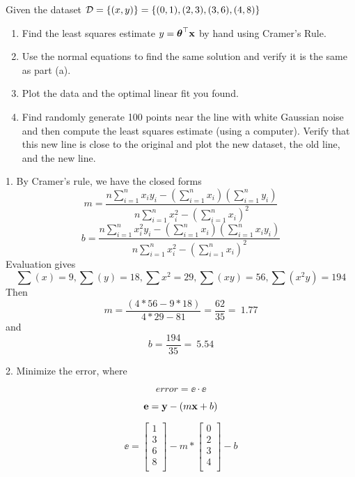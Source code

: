 \documentclass[12pt,letterpaper]{hmcpset}
\begin{document}
\begin{problem}[2]
Given the dataset ${\cal D} = \{(x,y)\} = \{(0,1), (2,3), (3,6), (4,8)\}$
\begin{enumerate}
   \item Find the least squares estimate $y = \hbox{\boldmath$\theta$}^\top{\bf x}$ by hand using
        Cramer's Rule.
    \item Use the normal equations to find the same solution and verify it
        is the same as part (a).
    \item Plot the data and the optimal linear fit you found.
    \item Find randomly generate 100 points near the line with white Gaussian
        noise and then compute the least squares estimate (using a computer).
        Verify that this new line is close to the original and plot the new
        dataset, the old line, and the new line.
\end{enumerate}

\end{problem}
\begin{solution}
1. By Cramer's rule, we have the closed forms
\[
    m = \frac{n\sum_{i=1}^n x_iy_i - (\sum_{i=1}^n x_i)(\sum_{i=1}^n y_i)}{n\sum_{i=1}^n x_i^2 - (\sum_{i=1}^n x_i)^2}
\]
\[
    b = \frac{n\sum_{i=1}^n x_i^2y_i - (\sum_{i=1}^n x_i)(\sum_{i=1}^n x_iy_i)}{n\sum_{i=1}^n x_i^2 - (\sum_{i=1}^n x_i)^2}
\]
Evaluation gives
\[
\sum(x) = 9, \sum(y) = 18, \sum{x^2} = 29, \sum(xy) = 56, \sum(x^2y) = 194
\]
Then
\[
m = \frac{(4*56 - 9*18)}{4*29 - 81}
= \frac{62}{35} =~ 1.77
\]
and
\[
b = \frac{194}{35} =~ 5.54
\]

2. Minimize the error, where

\[
 error = \ee \cdot \ee
\]

\[
 {\bf e} = {\bf y} - ( m {\bf x} + b )
\]

\[
 \ee =
 \begin{bmatrix}
   1 \\
   3 \\
   6 \\
   8 \\
\end{bmatrix}
 - m *
\begin{bmatrix}
  0 \\
  2 \\
  3 \\
  4 \\
\end{bmatrix}
 - b
\]

    \vfill
\end{solution}
\newpage
\end{document}
